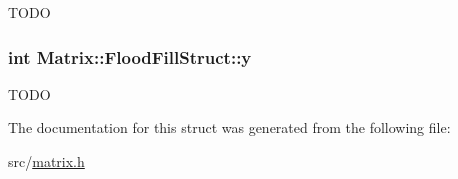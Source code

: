 \label{structMatrix_1_1FloodFillStruct_a1fdc18f462079d7272674bcd17a59a1c}
TODO \hypertarget{structMatrix_1_1FloodFillStruct_a89c4b7add321ddfb548e9caa0d97cb10}{
\subsubsection[{y}]{\setlength{\rightskip}{0pt plus 5cm}int {\bf Matrix::FloodFillStruct::y}}}
\label{structMatrix_1_1FloodFillStruct_a89c4b7add321ddfb548e9caa0d97cb10}
TODO 

The documentation for this struct was generated from the following file:\begin{DoxyCompactItemize}
\item 
src/\hyperlink{matrix_8h}{matrix.h}\end{DoxyCompactItemize}
